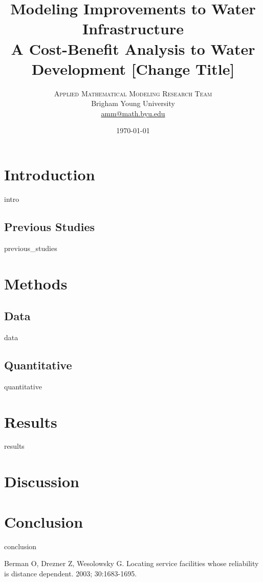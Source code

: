 \documentclass[twoside,twocolumn]{article}
\title{Modeling Improvements to Water Infrastructure \\ \large A Cost-Benefit Analysis to Water Development [Change Title]} %
\author{%
\textsc{Applied Mathematical Modeling Research Team}\\[1ex] %
\normalsize Brigham Young University  \\ %
\normalsize \href{mailto:amm@math.byu.edu}{amm@math.byu.edu} %
}
\date{\today} %
\begin{document}
\maketitle


\section*{Introduction}
{intro}
\subsection*{Previous Studies}
{previous_studies}
\section*{Methods}
\subsection*{Data}
{data}
\subsection*{Quantitative}
{quantitative}
\section*{Results}
{results}
\section*{Discussion}
\section*{Conclusion}
{conclusion}


\begin{thebibliography}{99} %

Berman O, Drezner Z, Wesolowsky G.
\newblock Locating service facilities whose reliability is distance dependent.
 2003; 30:1683-1695.

\end{thebibliography}

\newpage

\end{document}
